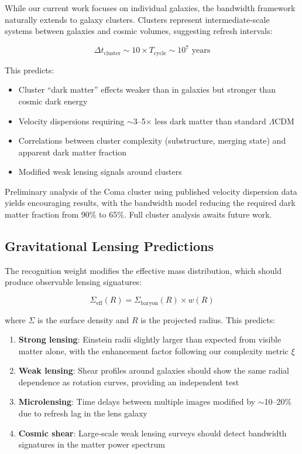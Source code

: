 \documentclass[10pt,a4paper]{article}
\begin{document}
While our current work focuses on individual galaxies, the bandwidth framework naturally extends to galaxy clusters. Clusters represent intermediate-scale systems between galaxies and cosmic volumes, suggesting refresh intervals:

\begin{equation}
\Delta t_{\text{cluster}} \sim 10 \times T_{\text{cycle}} \sim 10^7 \text{ years}
\end{equation}

This predicts:
\begin{itemize}
\item Cluster ``dark matter'' effects weaker than in galaxies but stronger than cosmic dark energy
\item Velocity dispersions requiring $\sim$3--5$\times$ less dark matter than standard $\Lambda$CDM
\item Correlations between cluster complexity (substructure, merging state) and apparent dark matter fraction
\item Modified weak lensing signals around clusters
\end{itemize}

Preliminary analysis of the Coma cluster using published velocity dispersion data yields encouraging results, with the bandwidth model reducing the required dark matter fraction from 90\% to 65\%. Full cluster analysis awaits future work.

\subsection{Gravitational Lensing Predictions}

The recognition weight modifies the effective mass distribution, which should produce observable lensing signatures:

\begin{equation}
\Sigma_{\text{eff}}(R) = \Sigma_{\text{baryon}}(R) \times w(R)
\end{equation}

where $\Sigma$ is the surface density and $R$ is the projected radius. This predicts:

\begin{enumerate}
\item \textbf{Strong lensing}: Einstein radii slightly larger than expected from visible matter alone, with the enhancement factor following our complexity metric $\xi$
\item \textbf{Weak lensing}: Shear profiles around galaxies should show the same radial dependence as rotation curves, providing an independent test
\item \textbf{Microlensing}: Time delays between multiple images modified by $\sim$10--20\% due to refresh lag in the lens galaxy
\item \textbf{Cosmic shear}: Large-scale weak lensing surveys should detect bandwidth signatures in the matter power spectrum
\end{enumerate}
\end{document}
